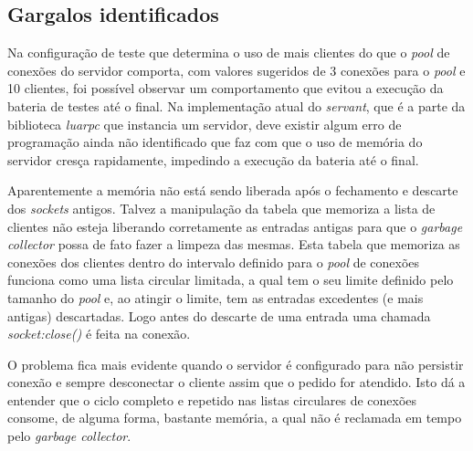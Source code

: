 \documentclass[11pt]{article}
\begin{document}
\subsection{Gargalos identificados}\label{subsec:bottle}

Na configuração de teste que determina o uso de mais clientes do que o
\textit{pool} de conexões do servidor comporta, com valores sugeridos de 3
conexões para o \textit{pool} e 10 clientes, foi possível observar um
comportamento que evitou a execução da bateria de testes até o final. Na
implementação atual do \textit{servant}, que é a parte da biblioteca
\textit{luarpc} que instancia um servidor, deve existir algum erro de
programação ainda não identificado que faz com que o uso de memória do servidor
cresça rapidamente, impedindo a execução da bateria até o final.

Aparentemente a memória não está sendo liberada após o fechamento e descarte dos
\textit{sockets} antigos. Talvez a manipulação da tabela que memoriza a lista de
clientes não esteja liberando corretamente as entradas antigas para que o
\textit{garbage collector} possa de fato fazer a limpeza das mesmas.  Esta
tabela que memoriza as conexões dos clientes dentro do intervalo definido para o
\textit{pool} de conexões funciona como uma lista circular limitada, a qual tem
o seu limite definido pelo tamanho do \textit{pool} e, ao atingir o limite, tem
as entradas excedentes (e mais antigas) descartadas. Logo antes do descarte de
uma entrada uma chamada \textit{socket:close()} é feita na conexão.

O problema fica mais evidente quando o servidor é configurado para não persistir
conexão e sempre desconectar o cliente assim que o pedido for atendido. Isto dá
a entender que o ciclo completo e repetido nas listas circulares de conexões
consome, de alguma forma, bastante memória, a qual não é reclamada em tempo pelo
\textit{garbage collector}.
\end{document}

